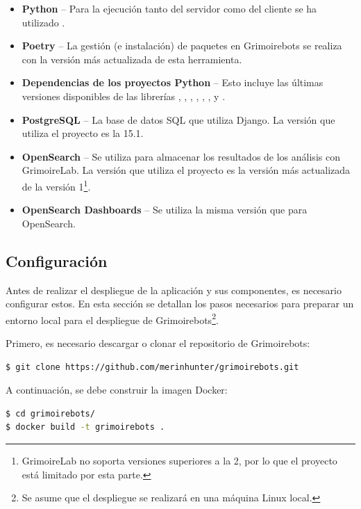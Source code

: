 \begin{itemize}
    \item \textbf{Python} -- Para la ejecución tanto del servidor como del cliente se ha utilizado .
    \item \textbf{Poetry} -- La gestión (e instalación) de paquetes en Grimoirebots se realiza con la versión más actualizada de esta herramienta.
    \item \textbf{Dependencias de los proyectos Python} -- Esto incluye las últimas versiones disponibles de las librerías , , , , , ,  y .
    \item \textbf{PostgreSQL} -- La base de datos SQL que utiliza Django. La versión que utiliza el proyecto es la 15.1.
    \item \textbf{OpenSearch} -- Se utiliza para almacenar los resultados de los análisis con GrimoireLab. La versión que utiliza el proyecto es la versión más actualizada de la versión 1\footnote{GrimoireLab no soporta versiones superiores a la 2, por lo que el proyecto está limitado por esta parte.}.
    \item \textbf{OpenSearch Dashboards} -- Se utiliza la misma versión que para OpenSearch.
\end{itemize}

\subsection{Configuración}

Antes de realizar el despliegue de la aplicación y sus componentes, es necesario configurar estos. En esta sección se detallan los pasos necesarios para preparar un entorno local para el despliegue de Grimoirebots\footnote{Se asume que el despliegue se realizará en una máquina Linux local.}.

Primero, es necesario descargar o clonar el repositorio de Grimoirebots:

\begin{lstlisting}[language=bash]
$ git clone https://github.com/merinhunter/grimoirebots.git
\end{lstlisting}

A continuación, se debe construir la imagen Docker:

\begin{lstlisting}[language=bash]
$ cd grimoirebots/
$ docker build -t grimoirebots .
\end{lstlisting}

